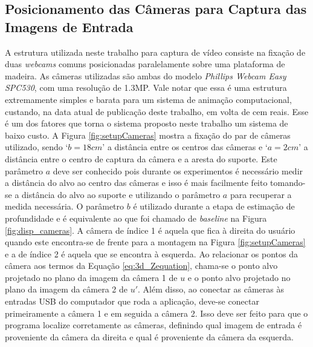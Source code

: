 \subsection{Posicionamento das Câmeras para Captura das Imagens de Entrada}


A estrutura utilizada neste trabalho para captura de vídeo consiste na fixação
de duas \textit{webcams} comuns posicionadas paralelamente sobre uma plataforma
de madeira. As câmeras utilizadas são ambas do modelo \textit{Phillips Webcam Easy 
SPC530}, com uma resolução de 1.3MP. Vale notar que essa é uma estrutura extremamente 
simples e barata para um 
sistema de animação computacional, custando, na data atual de publicação deste trabalho, em 
volta de cem reais. Esse é um dos fatores que 
torna o sistema proposto neste trabalho um sistema de baixo custo. A Figura 
\ref{fig:setupCameras} mostra a fixação do 
par de câmeras utilizado, sendo `$b = 18cm$'  a distância entre os centros das câmeras e 
`$a=2 cm$' a distância entre o centro de captura da câmera e a aresta do suporte.
Este parâmetro $a$ deve ser conhecido pois durante os experimentos é necessário
medir a distância do alvo ao centro das câmeras e isso é mais facilmente feito
tomando-se a distância do alvo ao suporte e utilizando o parâmetro $a$ para
recuperar a medida necessária. O parâmetro $b$ é utilizado durante a etapa de
estimação de profundidade e é equivalente ao que foi chamado de
\textit{baseline} na Figura \ref{fig:disp_cameras}. A câmera de índice 1 é
aquela que fica à direita do usuário quando este encontra-se de frente para a
montagem na Figura \ref{fig:setupCameras} e a de índice 2 é aquela que se
encontra à esquerda. Ao relacionar os pontos da câmera aos termos da Equação
\ref{eq:3d_Zequation}, chama-se o ponto alvo projetado no plano da imagem da
câmera 1 de $u$ e o ponto alvo projetado no plano da imagem da câmera 2 de $u'$.
Além disso, ao conectar as câmeras às entradas USB do computador que roda a
aplicação, deve-se conectar primeiramente a câmera 1 e em seguida a câmera 2.
Isso deve ser feito para que o programa localize corretamente as câmeras,
definindo qual imagem de entrada é proveniente da câmera da direita e qual é
proveniente da câmera da esquerda. 


